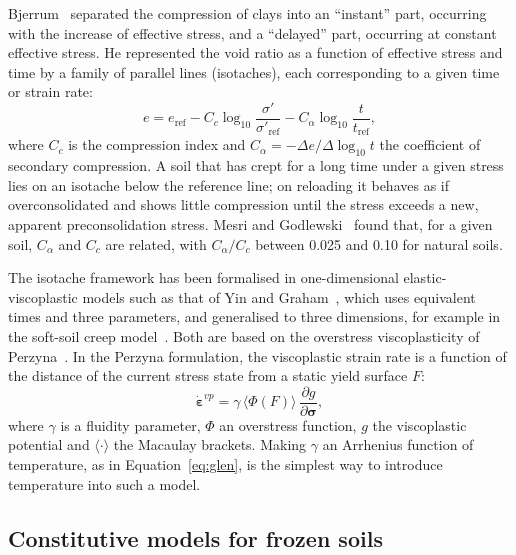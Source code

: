 Bjerrum~\cite{bjerrum1967} separated the compression of clays into an ``instant'' part, occurring with the increase of effective stress, and a ``delayed'' part, occurring at constant effective stress. He represented the void ratio as a function of effective stress and time by a family of parallel lines (isotaches), each corresponding to a given time or strain rate:
\begin{equation}
    e = e_{\mathrm{ref}} - C_c \log_{10}\frac{\sigma'}{\sigma'_{\mathrm{ref}}} - C_\alpha \log_{10}\frac{t}{t_{\mathrm{ref}}},
    \label{eq:isotache_bjerrum}
\end{equation}
where $C_c$ is the compression index and $C_\alpha = -\Delta e/\Delta\log_{10}t$ the coefficient of secondary compression. A soil that has crept for a long time under a given stress lies on an isotache below the reference line; on reloading it behaves as if overconsolidated and shows little compression until the stress exceeds a new, apparent preconsolidation stress. Mesri and Godlewski~\cite{mesri1977} found that, for a given soil, $C_\alpha$ and $C_c$ are related, with $C_\alpha/C_c$ between 0.025 and 0.10 for natural soils.

The isotache framework has been formalised in one-dimensional elastic-viscoplastic models such as that of Yin and Graham~\cite{yin1989,yin1994}, which uses equivalent times and three parameters, and generalised to three dimensions, for example in the soft-soil creep model~\cite{vermeer1999}. Both are based on the overstress viscoplasticity of Perzyna~\cite{perzyna1966}. In the Perzyna formulation, the viscoplastic strain rate is a function of the distance of the current stress state from a static yield surface $F$:
\begin{equation}
    \dot{\boldsymbol\varepsilon}^{vp} = \gamma\,\langle\Phi(F)\rangle\,\frac{\partial g}{\partial\boldsymbol\sigma},
    \label{eq:perzyna}
\end{equation}
where $\gamma$ is a fluidity parameter, $\Phi$ an overstress function, $g$ the viscoplastic potential and $\langle\cdot\rangle$ the Macaulay brackets. Making $\gamma$ an Arrhenius function of temperature, as in Equation~\eqref{eq:glen}, is the simplest way to introduce temperature into such a model.

\subsection{Constitutive models for frozen soils}
\label{subsec:frozen_models}

